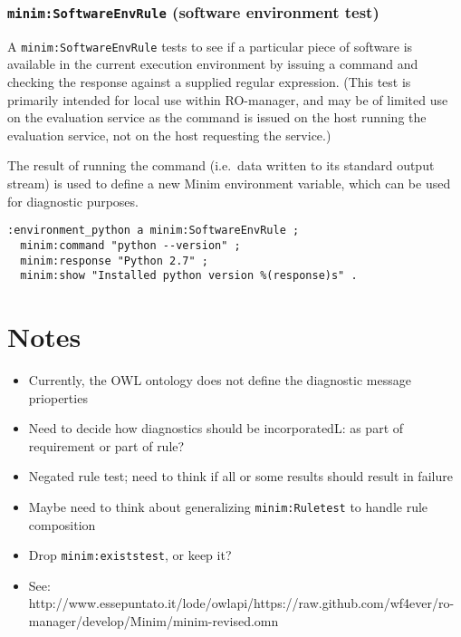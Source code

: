 \documentclass[]{article}
\begin{document}
\subsubsection{\texttt{minim:SoftwareEnvRule} (software environment
test)}

A \texttt{minim:SoftwareEnvRule} tests to see if a particular piece of
software is available in the current execution environment by issuing a
command and checking the response against a supplied regular expression.
(This test is primarily intended for local use within RO-manager, and
may be of limited use on the evaluation service as the command is issued
on the host running the evaluation service, not on the host requesting
the service.)

The result of running the command (i.e.~data written to its standard
output stream) is used to define a new Minim environment variable, which
can be used for diagnostic purposes.

\begin{verbatim}
:environment_python a minim:SoftwareEnvRule ;
  minim:command "python --version" ;
  minim:response "Python 2.7" ;
  minim:show "Installed python version %(response)s" .
\end{verbatim}

\section{Notes}

\begin{itemize}
\itemsep1pt\parskip0pt
\item
  Currently, the OWL ontology does not define the diagnostic message
  prioperties
\item
  Need to decide how diagnostics should be incorporatedL: as part of
  requirement or part of rule?
\item
  Negated rule test; need to think if all or some results should result
  in failure
\item
  Maybe need to think about generalizing \texttt{minim:Ruletest} to
  handle rule composition
\item
  Drop \texttt{minim:existstest}, or keep it?
\item
  See:
  http://www.essepuntato.it/lode/owlapi/https://raw.github.com/wf4ever/ro-manager/develop/Minim/minim-revised.omn
\end{itemize}
\end{document}
